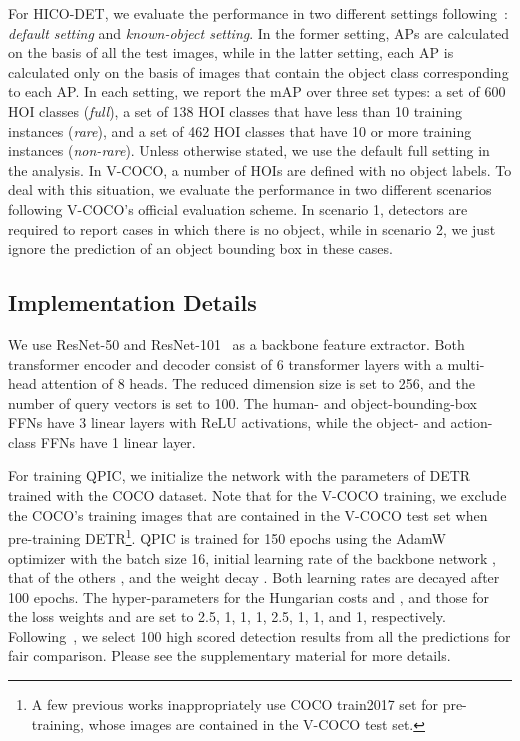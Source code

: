 \documentclass[final]{cvpr}
\begin{document}
For HICO-DET, we evaluate the performance in two different settings following~\cite{chao_wacv2018}: {\it default setting} and {\it known-object setting}.
In the former setting, APs are calculated on the basis of all the test images, while in the latter setting, each AP is calculated only on the basis of images that contain the object class corresponding to each AP. 
In each setting, we report the mAP over three set types: a set of 600 HOI classes ({\it full}), a set of 138 HOI classes that have less than 10 training instances ({\it rare}), and a set of 462 HOI classes that have 10 or more training instances ({\it non-rare}).
Unless otherwise stated, we use the default full setting in the analysis.
In V-COCO, a number of HOIs are defined with no object labels.
To deal with this situation, we evaluate the performance in two different scenarios following V-COCO's official evaluation scheme. 
In scenario 1, detectors are required to report cases in which there is no object, while in scenario 2, we just ignore the prediction of an object bounding box in these cases.

\subsection{Implementation Details}
We use ResNet-50 and ResNet-101~\cite{he_cvpr2016} as a backbone feature extractor. 
Both transformer encoder and decoder consist of 6 transformer layers with a multi-head attention of 8 heads. The reduced dimension size  is set to 256, and the number of query vectors  is set to 100.
The human- and object-bounding-box FFNs have 3 linear layers with ReLU activations, while the object- and action-class FFNs have 1 linear layer.

For training QPIC, we initialize the network with the parameters of DETR~\cite{carion_eccv2020} trained with the COCO dataset. Note that for the V-COCO training, we exclude the COCO's training images that are contained in the V-COCO test set when pre-training DETR\footnote{A few previous works inappropriately use COCO train2017 set for pre-training, whose images are contained in the V-COCO test set.}. 
QPIC is trained for 150 epochs using the AdamW~\cite{loshchiloy_iclr2019} optimizer with the batch size 16, initial learning rate of the backbone network , that of the others , and the weight decay . Both learning rates are decayed after 100 epochs. The hyper-parameters for the Hungarian costs  and , and those for the loss weights  and  are set to 2.5, 1, 1, 1, 2.5, 1, 1, and 1, respectively.
Following~\cite{liao_cvpr2020}, we select 100 high scored detection results from all the predictions for fair comparison.
Please see the supplementary material for more details.
\end{document}
